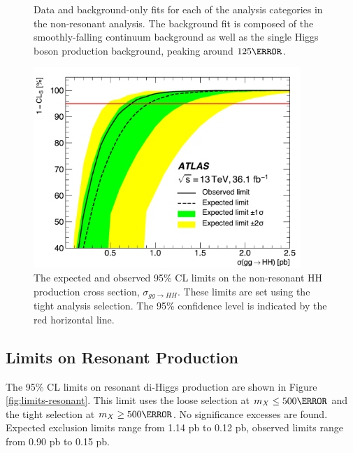 \begin{figure}[htbp]
	\caption{Data and background-only fits for each of the analysis categories in the non-resonant analysis. The background fit is composed of the smoothly-falling continuum \yy background as well as the single Higgs boson production background, peaking around $\unit{125}{\GeV}$.}
  \label{fig:results-myy}
\end{figure}


\begin{figure}[htbp]
  \centering
\includegraphics[width=0.9\textwidth]{chapters/chapter5_yybb/images/limits/nonresonant.pdf}
  \caption[The expected and observed limits on the non-resonant HH production cross section]
  {The expected and observed 95\% \gls{CL} limits on the non-resonant HH production cross section, $\sigma_{gg\rightarrow HH}$. These limits are set using the tight analysis selection. The 95\% confidence level is indicated by the red horizontal line.}
  \label{fig:limits-nonresonant}
\end{figure}

\subsection{Limits on Resonant Production}

The 95\% \gls{CL} limits on resonant di-Higgs production are shown in Figure \ref{fig:limits-resonant}. This limit uses the loose selection at $m_{X} \leq \unit{500}{\GeV}$ and the tight selection at $m_{X} \geq \unit{500}{\GeV}$. No significance excesses are found. Expected exclusion limits range from 1.14 pb to 0.12 pb, observed limits range from 0.90 pb to 0.15 pb.

